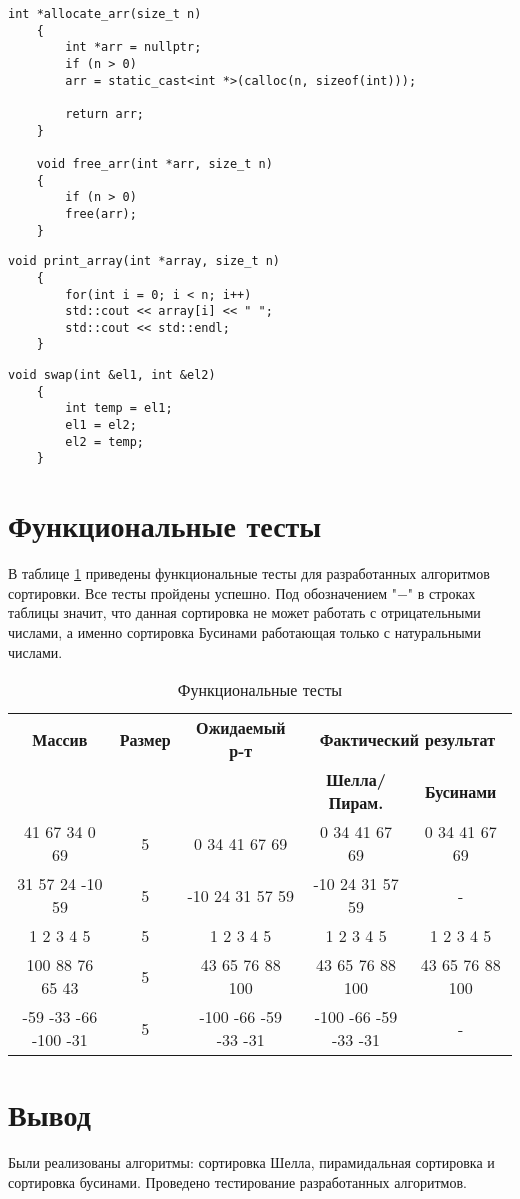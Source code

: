 \clearpage

\begin{lstlisting}[label=lst:allocate,caption=Функции выделение и освобождение памяти под массив]
	int *allocate_arr(size_t n)
	{
		int *arr = nullptr;
		if (n > 0)
		arr = static_cast<int *>(calloc(n, sizeof(int)));
		
		return arr;
	}
	
	void free_arr(int *arr, size_t n)
	{
		if (n > 0)
		free(arr);
	}
\end{lstlisting}

\begin{lstlisting}[label=lst:print,caption=Функция вывода print\_arr]
	void print_array(int *array, size_t n)
	{
		for(int i = 0; i < n; i++)
		std::cout << array[i] << " ";
		std::cout << std::endl;
	}
\end{lstlisting}

\begin{lstlisting}[label=lst:swap,caption=Функция перестановки элементов места swap]
	void swap(int &el1, int &el2)
	{
		int temp = el1;
		el1 = el2;
		el2 = temp;
	}
\end{lstlisting}

\clearpage

\section{Функциональные тесты}

В таблице \ref{tbl:func_tests} приведены функциональные тесты для разработанных алгоритмов сортировки. Все тесты пройдены успешно.
Под обозначением "$-$" в строках таблицы значит, что данная сортировка не может работать с отрицательными числами, а именно сортировка Бусинами работающая только с натуральными числами.

\begin{table}[ht]
	\small
	\begin{center}
		\caption{Функциональные тесты}
		\label{tbl:func_tests}
		\begin{tabular}{|c|c|c|c|c|}
			\hline
			\bfseries Массив
			& \bfseries Размер
			& \bfseries Ожидаемый р-т
			& \multicolumn{2}{c|}{\bfseries Фактический результат} \\ \cline{4-5}
			& & & \bfseries Шелла/Пирам. & \bfseries Бусинами \\
			\hline
			41 67 34 0 69 & 5 & 0 34 41 67 69 & 0 34 41 67 69 & 0 34 41 67 69 \\
			\hline
			31 57 24 -10 59 & 5 & -10 24 31 57 59 & -10 24 31 57 59 & - \\
			\hline
			1 2 3 4 5 & 5 & 1 2 3 4 5 & 1 2 3 4 5 & 1 2 3 4 5 \\
			\hline
			100 88 76 65 43 & 5 & 43 65 76 88 100 & 43 65 76 88 100 & 43 65 76 88 100 \\
			\hline
			-59 -33 -66 -100 -31 & 5 & -100 -66 -59 -33 -31 & -100 -66 -59 -33 -31 & - \\
			\hline
		\end{tabular}
	\end{center}
\end{table}

\section{Вывод}

Были реализованы алгоритмы: сортировка Шелла, пирамидальная сортировка и сортировка бусинами. Проведено тестирование разработанных алгоритмов.